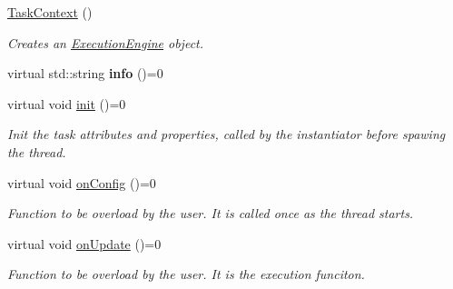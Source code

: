 \begin{DoxyCompactItemize}
\item 
\hypertarget{classcoco_1_1_task_context_a2254f581ed334e5273246e88c05ddfed}{}\hyperlink{classcoco_1_1_task_context_a2254f581ed334e5273246e88c05ddfed}{Task\+Context} ()\label{classcoco_1_1_task_context_a2254f581ed334e5273246e88c05ddfed}

\begin{DoxyCompactList}\small\item\em Creates an \hyperlink{classcoco_1_1_execution_engine}{Execution\+Engine} object. \end{DoxyCompactList}\item 
\hypertarget{classcoco_1_1_task_context_adb443956ebfd96472f7a8ed0e4042054}{}virtual std\+::string {\bfseries info} ()=0\label{classcoco_1_1_task_context_adb443956ebfd96472f7a8ed0e4042054}

\item 
\hypertarget{classcoco_1_1_task_context_a4ac24bd71202d3e87d487dd24d47d9a0}{}virtual void \hyperlink{classcoco_1_1_task_context_a4ac24bd71202d3e87d487dd24d47d9a0}{init} ()=0\label{classcoco_1_1_task_context_a4ac24bd71202d3e87d487dd24d47d9a0}

\begin{DoxyCompactList}\small\item\em Init the task attributes and properties, called by the instantiator before spawing the thread. \end{DoxyCompactList}\item 
\hypertarget{classcoco_1_1_task_context_a397ba5231353db343c71280ca0502459}{}virtual void \hyperlink{classcoco_1_1_task_context_a397ba5231353db343c71280ca0502459}{on\+Config} ()=0\label{classcoco_1_1_task_context_a397ba5231353db343c71280ca0502459}

\begin{DoxyCompactList}\small\item\em Function to be overload by the user. It is called once as the thread starts. \end{DoxyCompactList}\item 
\hypertarget{classcoco_1_1_task_context_a75a4efc25d04977d15bfdd8407d29d07}{}virtual void \hyperlink{classcoco_1_1_task_context_a75a4efc25d04977d15bfdd8407d29d07}{on\+Update} ()=0\label{classcoco_1_1_task_context_a75a4efc25d04977d15bfdd8407d29d07}

\begin{DoxyCompactList}\small\item\em Function to be overload by the user. It is the execution funciton. \end{DoxyCompactList}\end{DoxyCompactItemize}
